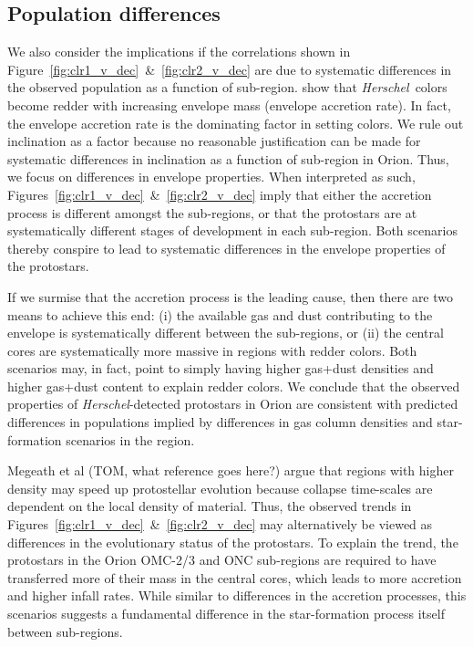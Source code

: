 \documentclass[manuscript]{aastex}
\newcommand{\herschel}{{\em Herschel}}
\begin{document}
\subsection{Population differences}
\label{sec:popdiff}
\par
We also consider the implications if the correlations shown in Figure~\ref{fig:clr1_v_dec}~\&~\ref{fig:clr2_v_dec} are due to systematic differences in the observed population as a function of sub-region.  \cite{ali} show that \herschel\ colors become redder with increasing envelope mass (envelope accretion rate).  In fact, the envelope accretion rate is the dominating factor in setting colors.  We rule out inclination as a factor because no reasonable justification can be made for systematic differences in inclination as a function of sub-region in Orion.  Thus, we focus on differences in envelope properties.  When interpreted as such, Figures~\ref{fig:clr1_v_dec}~\&~\ref{fig:clr2_v_dec}  imply that either the accretion process is different amongst the sub-regions, or that the protostars are at systematically different stages of development in each sub-region.   Both scenarios thereby conspire to lead to systematic differences in the envelope properties of the protostars.
\par
If we surmise that the accretion process is the leading cause, then there are two means to achieve this end: (i) the available gas and dust contributing to the envelope is systematically different between the sub-regions, or (ii) the central cores are systematically more massive in regions with redder colors.  Both scenarios may, in fact, point to simply having higher gas+dust densities and higher gas+dust content to explain redder colors.  We conclude that the observed properties of \herschel-detected protostars in Orion are consistent with predicted differences in populations implied by differences in gas column densities and star-formation scenarios in the region.
\par
Megeath et al (TOM, what reference goes here?) argue that regions with higher density may speed up protostellar evolution because collapse time-scales are dependent on the local density of material.  Thus, the observed trends in Figures~\ref{fig:clr1_v_dec}~\&~\ref{fig:clr2_v_dec} may alternatively be viewed as differences in the evolutionary status of the protostars.  To explain the trend, the protostars in the Orion OMC-2/3 and ONC sub-regions are required to have transferred more of their mass in the central cores, which leads to more accretion and higher infall rates.  While similar to differences in the accretion processes, this scenarios suggests a fundamental difference in the star-formation process itself between sub-regions.
\end{document}
